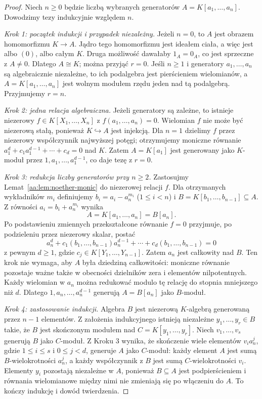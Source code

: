 \begin{proof}
Niech $n\ge0$ będzie liczbą wybranych generatorów
$A=K[a_1,\ldots,a_n]$. Dowodzimy tezy indukcyjnie względem $n$.

\emph{Krok 1: początek indukcji i przypadek niezależny.}
Jeżeli $n=0$, to $A$ jest obrazem homomorfizmu $K\to A$.
Jądro tego homomorfizmu jest ideałem ciała, a więc jest
albo $(0)$, albo całym $K$. Druga możliwość dawałaby $1_A=0_A$,
co jest sprzeczne z $A\ne0$.
Dlatego $A\cong K$; można przyjąć $r=0$.
Jeśli $n\ge1$ i generatory $a_1,\ldots,a_n$ są algebraicznie
niezależne, to ich podalgebra jest pierścieniem wielomianów,
a $A=K[a_1,\ldots,a_n]$ jest wolnym modułem rzędu jeden
nad tą podalgebrą. Przyjmujemy $r=n$.

\emph{Krok 2: jedna relacja algebraiczna.}
Jeżeli generatory są zależne, to istnieje niezerowy
$f\in K[X_1,\ldots,X_n]$ z $f(a_1,\ldots,a_n)=0$.
Wielomian $f$ nie może być niezerową stałą, ponieważ
$K\hookrightarrow A$ jest injekcją.
Dla $n=1$ dzielimy $f$ przez niezerowy współczynnik
najwyższej potęgi; otrzymujemy moniczne równanie
$a_1^d+c_1a_1^{d-1}+\cdots+c_d=0$ nad $K$.
Zatem $A=K[a_1]$ jest generowany jako $K$-moduł przez
$1,a_1,\ldots,a_1^{d-1}$, co daje tezę z $r=0$.

\emph{Krok 3: redukcja liczby generatorów przy $n\ge2$.}
Zastosujmy Lemat~\ref{aa:lem:noether-monic} do niezerowej
relacji $f$. Dla otrzymanych wykładników $m_i$ definiujemy
$b_i=a_i-a_n^{m_i}$ ($1\le i<n$) i
$B=K[b_1,\ldots,b_{n-1}]\subseteq A$.
Z równości $a_i=b_i+a_n^{m_i}$ wynika
\[
 A=K[a_1,\ldots,a_n]=B[a_n].
\]
Po podstawieniu zmiennych przekształcone równanie $f=0$
przyjmuje, po podzieleniu przez niezerowy skalar,
postać
\[
 a_n^d+c_1(b_1,\ldots,b_{n-1})a_n^{d-1}
 +\cdots+c_d(b_1,\ldots,b_{n-1})=0
\]
z pewnym $d\ge1$, gdzie $c_j\in K[Y_1,\ldots,Y_{n-1}]$.
Zatem $a_n$ jest całkowity nad $B$.
Ten krok nie wymaga, aby $A$ była dziedziną całkowitości:
moniczne równanie pozostaje ważne także w obecności
dzielników zera i elementów nilpotentnych.
Każdy wielomian w $a_n$ można redukować modulo tę relację
do stopnia mniejszego niż $d$.
Dlatego $1,a_n,\ldots,a_n^{d-1}$ generują $A=B[a_n]$
jako $B$-moduł.

\emph{Krok 4: zastosowanie indukcji.}
Algebra $B$ jest niezerową $K$-algebrą generowaną przez
$n-1$ elementów. Z założenia indukcyjnego istnieją
niezależne $y_1,\ldots,y_r\in B$ takie, że $B$ jest
skończonym modułem nad $C=K[y_1,\ldots,y_r]$.
Niech $v_1,\ldots,v_s$ generują $B$ jako $C$-moduł.
Z Kroku 3 wynika, że skończenie wiele elementów
$v_i a_n^j$, gdzie $1\le i\le s$ i $0\le j<d$,
generuje $A$ jako $C$-moduł:
każdy element $A$ jest sumą $B$-wielokrotności $a_n^j$,
a każdy współczynnik z $B$ jest sumą $C$-wielokrotności $v_i$.
Elementy $y_i$ pozostają niezależne w $A$, ponieważ
$B\subseteq A$ jest podpierścieniem i równania
wielomianowe między nimi nie zmieniają się po włączeniu do $A$.
To kończy indukcję i dowód twierdzenia.
\end{proof}

